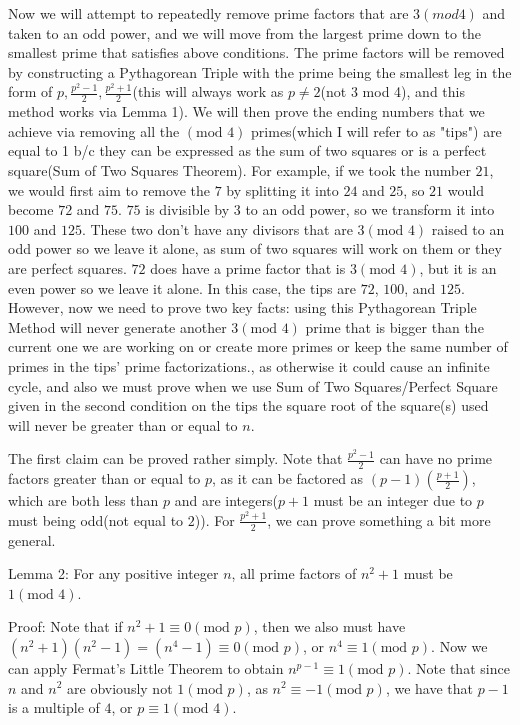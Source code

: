 \begin{enumerate}
 Now we will attempt to repeatedly remove prime factors that are $3(mod 4)$ and taken to an odd power, and we will move from the largest prime down to the smallest prime that satisfies above conditions. The prime factors will be removed by constructing a Pythagorean Triple with the prime being the smallest leg in the form of $p,\frac{p^2-1}{2},\frac{p^2+1}{2}$(this will always work as $p\neq 2$(not 3 mod 4), and this method works via Lemma 1). We will then prove the ending numbers that we achieve via removing all the $(\text{mod } 4)$ primes(which I will refer to as "tips") are equal to 1 b/c they can be expressed as the sum of two squares or is a perfect square(Sum of Two Squares Theorem). For example, if we took the number $21$, we would first aim to remove the $7$ by splitting it into $24$ and $25$, so $21$ would become $72$ and $75$. $75$ is divisible by $3$ to an odd power, so we transform it into $100$ and $125$. These two don't have any divisors that are $3 (\text{mod } 4)$ raised to an odd power so we leave it alone, as sum of two squares will work on them or they are perfect squares. $72$ does have a prime factor that is $3(\text{mod } 4)$, but it is an even power so we leave it alone. In this case, the tips are $72$, $100$, and $125$. However, now we need to prove two key facts: using this Pythagorean Triple Method will never generate another $3(\text{mod } 4)$ prime that is bigger than the current one we are working on or create more primes or keep the same number of primes in the tips' prime factorizations., as otherwise it could cause an infinite cycle, and also we must prove when we use Sum of Two Squares/Perfect Square given in the second condition on the tips the square root of the square(s) used will never be greater than or equal to $n$.

 The first claim can be proved rather simply. Note that $\frac{p^2-1}{2}$ can have no prime factors greater than or equal to $p$, as it can be factored as $(p-1)(\frac{p+1}{2})$, which are both less than $p$ and are integers($p+1$ must be an integer due to $p$ must being odd(not equal to $2$)). For $\frac{p^2+1}{2}$, we can prove something a bit more general.

 Lemma 2: For any positive integer $n$, all prime factors of $n^2+1$ must be $1(\text{mod } 4)$.

 Proof: Note that if $n^2+1\equiv 0(\text{mod } p)$, then we also must have $(n^2+1)(n^2-1)=(n^4-1)\equiv 0(\text{mod } p)$, or $n^4 \equiv 1(\text{mod } p)$. Now we can apply Fermat's Little Theorem to obtain $n^{p-1}\equiv 1(\text{mod } p)$. Note that since $n$ and $n^2$ are obviously not $1(\text{mod } p)$, as $n^2\equiv -1 (\text{mod } p)$, we have that $p-1$ is a multiple of $4$, or $p \equiv 1(\text{mod } 4)$.


\end{enumerate}
